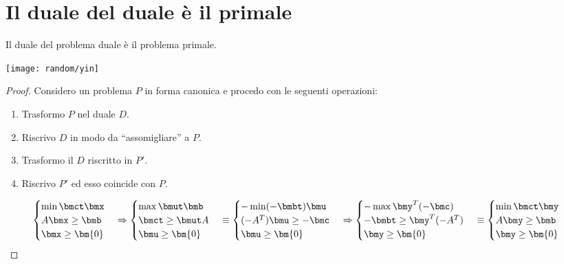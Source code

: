 \documentclass[\main/main.tex]{subfiles}
\begin{document}
\section{Il duale del duale è il primale}
\begin{minipage}{\textwidth}
  \begin{minipage}{.83\textwidth}
    \flushleft
    \begin{theorem}
      Il duale del problema duale è il problema primale.
    \end{theorem}
  \end{minipage}\hfill
  \begin{minipage}{0.15\textwidth}\center
    \texttt{[image: random/yin]}
  \end{minipage}
\end{minipage}

\begin{proof}
  Considero un problema $P$ in forma canonica e procedo con le seguenti operazioni:

  \begin{enumerate}
    \item Trasformo $P$ nel duale $D$.
    \item Riscrivo $D$ in modo da ``assomigliare'' a $P$.
    \item Trasformo il $D$ riscritto in $P'$.
    \item Riscrivo $P'$ ed esso coincide con $P$.
  \end{enumerate}

  \[
    \begin{cases}
      \min \bmct \bmx \\
      A\bmx \geq \bmb \\
      \bmx \geq \bm{0}
    \end{cases}
    \Rightarrow
    \begin{cases}
      \max \bmut\bmb     \\
      \bmct \geq \bmut A \\
      \bmu \geq \bm{0}
    \end{cases}
    \equiv
    \begin{cases}
      - \min (-\bmbt)\bmu   \\
      (-A^T)\bmu \geq -\bmc \\
      \bmu \geq \bm{0}
    \end{cases}
    \Rightarrow
    \begin{cases}
      - \max \bmy^T(-\bmc)     \\
      -\bmbt \geq \bmy^T(-A^T) \\
      \bmy \geq \bm{0}
    \end{cases}
    \equiv
    \begin{cases}
      \min \bmct \bmy \\
      A\bmy\geq \bmb  \\
      \bmy \geq \bm{0}
    \end{cases}
  \]

\end{proof}
\end{document}
